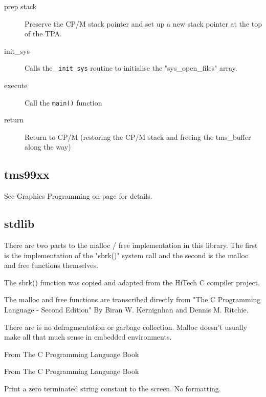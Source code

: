 \documentclass[10pt,a4paper,hidelinks]{article}
\begin{document}
\begin{description}
  \item[prep stack] Preserve the CP/M stack pointer and set up a new stack
    pointer at the top of the TPA.
  \item[init\_sys] Calls the \texttt{\_init\_sys} routine to initialise the
    "sys\_open\_files" array.
  \item[execute] Call the \texttt{main()} function
  \item[return] Return to CP/M (restoring the CP/M stack and freeing the
    tms\_buffer along the way)
\end{description}

\subsection{tms99xx}

See Graphics Programming on page \pageref{graphicsprogramming} for details.


\subsection{stdlib}

There are two parts to the malloc / free implementation in this library.  The
first is the implementation of the "sbrk()" system call and the second is the
malloc and free functions themselves.

The sbrk() function was copied and adapted from the HiTech C compiler project.

The malloc and free functions are transcribed directly from "The C Programming
Language - Second Edition" By Biran W. Kernignhan and Dennis M. Ritchie.

There are is no defragmentation or garbage collection.  Malloc doesn't usually
make all that much sense in embedded environments.

\begin{description}[font=$\bullet$~\normalfont\scshape\color{red!50!black}]
  \item[abs]
  \item[exit]
  \item[free] From The C Programming Language Book
  \item[itoa]
  \item[malloc] From The C Programming Language Book
  \item[puts] Print a zero terminated string constant to the screen.  No
    formatting.
\end{description}
\end{document}
